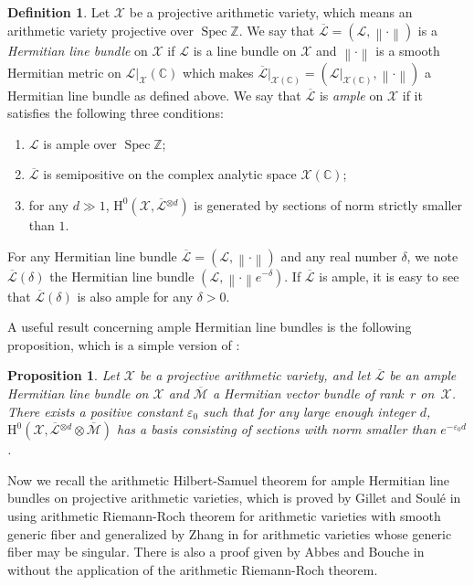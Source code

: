 \documentclass[JEP,XML,SOM,Unicode,published]{cedram}
\newenvironment{enumeratei}
{\bgroup\def\theenumi{\roman{enumi}}\def\theenumii{\arabic{enumii}}\begin{enumerate}}
{\end{enumerate}\egroup}
\theoremstyle{plain}
\newtheorem{prop}[thm]{Proposition}
\theoremstyle{definition}
\newtheorem*{defi}{Definition}
\newcommand{\ho}{\mathrm{H}}
\newcommand{\X}{\mathcal{X}}
\newcommand{\Li}{\overline{\mathcal{L}}{}}
\newcommand{\li}{\mathcal{L}}
\newcommand{\Z}{\mathbb{Z}}
\newcommand{\bbC}{\mathbb{C}}
\DeclareMathOperator{\Spec}{Spec}
\begin{document}
\begin{defi}
Let $\X$ be a projective arithmetic variety, which means an arithmetic variety projective over $\Spec \Z$. We say that $\Li=(\li, \left\lVert\cdot\right\rVert)$ is a \emph{Hermitian line bundle} on $\X$ if $\li$ is a line bundle on $\X$ and $\left\lVert\cdot\right\rVert$ is a smooth Hermitian metric on $\li|_\X(\bbC)$ which makes $\Li|_{\X(\bbC)}=(\li|_{\X(\bbC)}, \left\lVert\cdot\right\rVert)$ a Hermitian line bundle as defined above. We say that $\Li$ is \emph{ample} on $\X$ if it satisfies the following three conditions:
\begin{enumeratei}
\item $\li$ is ample over $\Spec \Z$;
\item $\Li$ is semipositive on the complex analytic space $\X(\bbC)$;
\item for any $d\gg 1$, $\ho^0(\X,\Li^{\otimes d})$ is generated by sections of norm strictly smaller than $1$.
\end{enumeratei}
\end{defi}

For any Hermitian line bundle $\Li=(\li, \left\lVert\cdot\right\rVert)$ and any real number $\delta$, we note $\Li(\delta)$ the Hermitian line bundle $(\li, \left\lVert\cdot\right\rVert e^{-\delta})$. If $\Li$ is ample, it is easy to see that $\Li(\delta)$ is also ample for any $\delta>0$.

A useful result concerning ample Hermitian line bundles is the following proposition, which is a simple version of \cite[Prop.\,2.4]{Ch17}:
\begin{prop}\label{epsilon}
Let $\X$ be a projective arithmetic variety, and let $\Li$ be an ample Hermitian line bundle on $\X$ and $\overline{\mathcal{M}}$ a Hermitian vector bundle of rank~$r$ on~$\X$. There exists a positive constant $\varepsilon_0$ such that for any large enough integer $d$, \hbox{$\ho^0(\X, \Li^{\otimes d}\otimes \overline{\mathcal{M}})$} has a basis consisting of sections with norm smaller than $e^{-\varepsilon_0 d}$.
\end{prop}
Now we recall the arithmetic Hilbert-Samuel theorem for ample Hermitian line bundles on projective arithmetic varieties, which is proved by Gillet and Soulé in \cite{GS92} using arithmetic Riemann-Roch theorem for arithmetic varieties with smooth generic fiber and generalized by Zhang in \cite{Zh95} for arithmetic varieties whose generic fiber may be singular. There is also a proof given by Abbes and Bouche in \cite{AB95} without the application of the arithmetic Riemann-Roch theorem.
\end{document}
